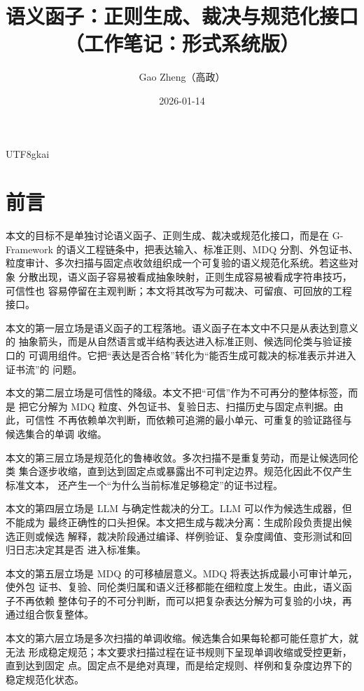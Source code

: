 \documentclass[12pt]{article}
\newcommand{\GFramework}{\textsf{G-Framework}}
\begin{document}
\begin{CJK*}{UTF8}{gkai}

\title{语义函子：正则生成、裁决与规范化接口\\（工作笔记：形式系统版）}
\author{Gao Zheng（高政）}
\date{2026-01-14}
\maketitle

\section*{前言}

本文的目标不是单独讨论语义函子、正则生成、裁决或规范化接口，而是在
\GFramework{} 的语义工程链条中，把表达输入、标准正则、MDQ 分割、外包证书、
粒度审计、多次扫描与固定点收敛组织成一个可复验的语义规范化系统。若这些对象
分散出现，语义函子容易被看成抽象映射，正则生成容易被看成字符串技巧，可信性也
容易停留在主观判断；本文将其改写为可裁决、可留痕、可回放的工程接口。

本文的第一层立场是语义函子的工程落地。语义函子在本文中不只是从表达到意义的
抽象箭头，而是从自然语言或半结构表达进入标准正则、候选同伦类与验证接口的
可调用组件。它把“表达是否合格”转化为“能否生成可裁决的标准表示并进入证书流”的
问题。

本文的第二层立场是可信性的降级。本文不把“可信”作为不可再分的整体标签，而是
把它分解为 MDQ 粒度、外包证书、复验日志、扫描历史与固定点判据。由此，可信性
不再依赖单次判断，而依赖可追溯的最小单元、可重复的验证路径与候选集合的单调
收缩。

本文的第三层立场是规范化的鲁棒收敛。多次扫描不是重复劳动，而是让候选同伦类
集合逐步收缩，直到达到固定点或暴露出不可判定边界。规范化因此不仅产生标准文本，
还产生一个“为什么当前标准足够稳定”的证书过程。

本文的第四层立场是 LLM 与确定性裁决的分工。LLM 可以作为候选生成器，但不能成为
最终正确性的口头担保。本文把生成与裁决分离：生成阶段负责提出候选正则或候选
解释，裁决阶段通过编译、样例验证、复杂度阈值、变形测试和回归日志决定其是否
进入标准集。

本文的第五层立场是 MDQ 的可移植层意义。MDQ 将表达拆成最小可审计单元，使外包
证书、复验、同伦类归属和语义迁移都能在细粒度上发生。由此，语义函子不再依赖
整体句子的不可分判断，而可以把复杂表达分解为可复验的小块，再通过组合恢复整体。

本文的第六层立场是多次扫描的单调收缩。候选集合如果每轮都可能任意扩大，就无法
形成稳定规范；本文要求扫描过程在证书规则下呈现单调收缩或受控更新，直到达到固定
点。固定点不是绝对真理，而是给定规则、样例和复杂度边界下的稳定规范化状态。


\end{CJK*}
\end{document}
